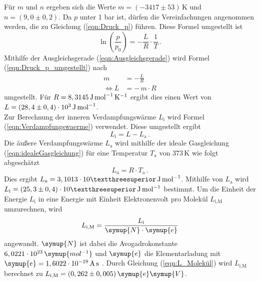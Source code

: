     Für $m$ und $n$ ergeben sich die Werte $m = (-3417 \pm 53) \, \unit{\kelvin}$
    und $n = (9,0 \pm 0,2)$.
    Da $p$ unter 1 bar ist, dürfen die Vereinfachungen angenommen werden, die zu Gleichung (\ref{eqn:Druck_p}) führen. Diese Formel umgestellt ist 
    \begin{equation}
      \label{eqn:Druck_p_umgestellt}
      \ln{\left(\frac{p}{p_0}\right)} = - \frac{L}{R} \cdot \frac{1}{T} \, . 
    \end{equation}
    Mithilfe der Ausgleichsgerade (\ref{eqn:Ausgleichsgerade}) wird Formel 
    (\ref{eqn:Druck_p_umgestellt}) nach 
    \begin{align}
      m &= - \frac{L}{R} \\
      \Leftrightarrow L &= - \, m \cdot R
    \end{align}
    umgestellt. Für $R = 8,3145 \, \unit[per-mode=reciprocal]{\joule\per\mol\per\kelvin}$ \cite{R_Konstante} ergibt dies einen Wert von $L = (28,4 \pm 0,4) \cdot 10^3 \, \unit[per-mode=reciprocal]{\joule\per\mol}$.
    \\
    Zur Berechnung der inneren Verdampfungswärme $L_{\text{i}}$ wird Formel (\ref{eqn:Verdampfungswaerme}) verwendet. Diese umgestellt ergibt 
    \begin{equation}
      L_{\text{i}} = L - L_{\text{a}} \, . 
    \end{equation}
    Die äußere Verdampfungswärme $L_{\text{a}}$ wird mithilfe der ideale Gasgleichung (\ref{eqn:idealeGasgleichung}) für eine Temperatur $T_{\text{a}}$ von $373 \, \unit{\kelvin}$ wie folgt abgeschätzt
    \begin{equation}
      L_{\text{a}} = R \cdot  T_{\text{a}}\, . 
    \end{equation}
    Dies ergibt $L_{\text{a}} = 3,1013 \cdot 10³ \, \unit[per-mode=reciprocal]{\joule\per\mol}$. 
    Mithilfe von $L_{\text{a}}$ wird $L_{\text{i}} = (25,3 \pm 0,4) \cdot 10³ \, \unit[per-mode=reciprocal]{\joule\per\mol}$ bestimmt. 
    Um die Einheit der Energie $L_{\text{i}}$ in eine Energie mit Einheit Elektronenvolt pro Molekül $L_{\text{i,M}}$ umzurechnen, wird 
    \begin{equation}
      L_{\text{i,M}} = \frac{L_{\text{i}}}{\symup{N} \cdot \symup{e}}
      \label{eqn:L_Molekül}
    \end{equation}
    angewandt. $\symup{N}$ ist dabei die Avogadrokonstante $6,0221 \cdot 10^{23} \, \symup{mol^{-1}}$ \cite{N_Konstante} und $\symup{e}$ die Elementarladung mit 
    $\symup{e} = 1,6022 \cdot 10^{-19} \, \unit{\ampere\second}$ \cite{e_Konstante}. 
    Durch Gleichung (\ref{eqn:L_Molekül}) wird $L_{\text{i,M}}$ berechnet zu $L_{\text{i,M}} = (0,262 \pm 0,005) \, \symup{e}\symup{V}$.
    
